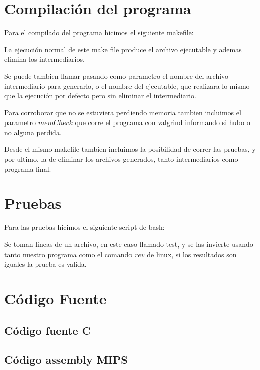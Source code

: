 \documentclass{article}
\begin{document}
\newpage

\section{Compilación del programa}

Para el compilado del programa hicimos el siguiente makefile:



La ejecución normal de este make file produce el archivo ejecutable y ademas elimina los intermediarios.

Se puede tambien llamar pasando como parametro el nombre del archivo intermediario para generarlo, o el nombre del ejecutable, que realizara lo mismo que la ejecución por defecto pero sin eliminar el intermediario.

Para corroborar que no se estuviera perdiendo memoria tambien incluimos el parametro \(memCheck\) que corre el programa con valgrind informando si hubo o no alguna perdida.

Desde el mismo makefile tambien incluimos la posibilidad de correr las pruebas, y por ultimo, la de eliminar los archivos generados, tanto intermediarios como programa final.

\section{Pruebas}

Para las pruebas hicimos el siguiente script de bash:



Se toman lineas de un archivo, en este caso llamado test, y se las invierte usando tanto nuestro programa como el comando \( rev \) de linux, si los resultados son iguales la prueba es valida.

\section{C\'odigo Fuente}

\subsection{C\'odigo fuente C}



\subsection{C\'odigo assembly MIPS}
\end{document}
